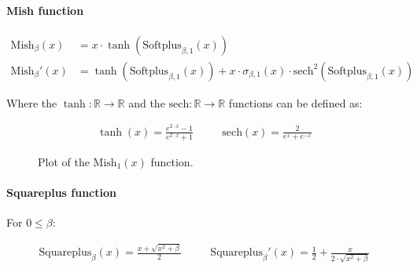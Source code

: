 \documentclass{article}
\begin{document}
        \paragraph{Mish function}

          \begin{align*}
            \text{Mish}_\beta (x)
              & = x \cdot \tanh(\text{Softplus}_{\beta, 1} (x)) \\
            \text{Mish}_\beta' (x)
              & = \tanh(\text{Softplus}_{\beta, 1} (x))
                  +
                  x
                  \cdot
                  \sigma_{\beta, 1} (x)
                  \cdot
                  \text{sech}^2 \left( \text{Softplus}_{\beta, 1} (x) \right)
          \end{align*}

          Where the $\tanh : \mathbb{R} \rightarrow \mathbb{R}$ and the
          $\text{sech} : \mathbb{R} \rightarrow \mathbb{R}$ functions can be
          defined as:

          \begin{align*}
            \tanh(x) = \frac{e^{2 \cdot x} -1}{e^{2 \cdot x} + 1}
            & \quad &
            \text{sech} (x) = \frac{2}{e^x + e^{-x}}
          \end{align*}

          \begin{figure}[!htb]
            \centering
            \caption{%
              Plot of the $\text{Mish}_{1}(x)$ function.
            }
          \end{figure}

        \paragraph{Squareplus function}

          For $0 \leq \beta$:

          \begin{align*}
            \text{Squareplus}_{\beta} (x) = \frac{x + \sqrt{x^2 + \beta}}{2}
            & \quad &
            \text{Squareplus}_{\beta}' (x)
              = \frac{1}{2} + \frac{x}{2 \cdot \sqrt{x^2 + \beta}}
          \end{align*}
\end{document}
